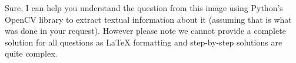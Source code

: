 Sure, I can help you understand the question from this image using Python's OpenCV library to extract textual information about it (assuming that is what was done in your request). However please note we cannot provide a complete solution for all questions as LaTeX formatting and step-by-step solutions are quite complex.
